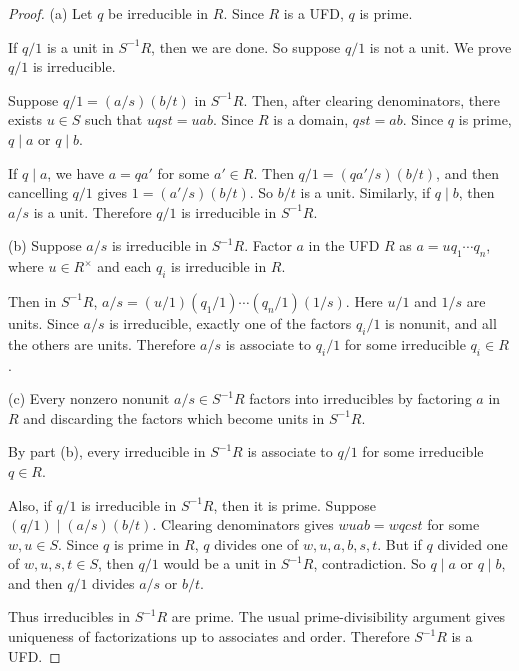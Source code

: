 \documentclass[addpoints,10pt]{exam}
\theoremstyle{plain}
\theoremstyle{definition}
\theoremstyle{plain}
\theoremstyle{definition}
\begin{document}
\begin{proof}
(a)
Let $q$ be irreducible in $R$. Since $R$ is a UFD, $q$ is prime.

If $q/1$ is a unit in $S^{-1}R$, then we are done. So suppose $q/1$ is
not a unit. We prove $q/1$ is irreducible.

Suppose $q/1=(a/s)(b/t)$ in $S^{-1}R$. Then, after clearing
denominators, there exists $u\in S$ such that $uqst=uab$. Since $R$ is
a domain, $qst=ab$. Since $q$ is prime, $q\mid a$ or $q\mid b$.

If $q\mid a$, we have $a=qa'$ for some $a'\in R$. Then
$q/1=(qa'/s)(b/t)$, and then cancelling $q/1$ gives
$1=(a'/s)(b/t)$. So $b/t$ is a unit. Similarly, if $q\mid b$, then
$a/s$ is a unit. Therefore $q/1$ is irreducible in $S^{-1}R$.

(b)
Suppose $a/s$ is irreducible in $S^{-1}R$. Factor $a$ in the UFD $R$ as
$a=u q_1\cdots q_n$, where $u\in R^\times$ and each $q_i$ is irreducible
in $R$.

Then in $S^{-1}R$,
$a/s=(u/1)(q_1/1)\cdots(q_n/1)(1/s)$.
Here $u/1$ and $1/s$ are units. Since $a/s$ is irreducible, exactly one
of the factors $q_i/1$ is nonunit, and all the others are units.
Therefore $a/s$ is associate to $q_i/1$ for some irreducible $q_i\in R$.

(c)
Every nonzero nonunit $a/s\in S^{-1}R$ factors into irreducibles by
factoring $a$ in $R$ and discarding the factors which become units in
$S^{-1}R$.

By part (b), every irreducible in
$S^{-1}R$ is associate to $q/1$ for some irreducible $q\in R$.

Also, if $q/1$ is irreducible in $S^{-1}R$, then it is prime. Suppose $(q/1)\mid (a/s)(b/t)$. Clearing denominators gives
$wuab=wqcst$ for some $w,u\in S$. Since $q$ is prime in $R$, $q$ divides
one of $w,u,a,b,s,t$. But if $q$ divided one of $w,u,s,t\in S$, then
$q/1$ would be a unit in $S^{-1}R$, contradiction. So $q\mid a$ or
$q\mid b$, and then $q/1$ divides $a/s$ or $b/t$.

Thus irreducibles in $S^{-1}R$ are prime. The usual prime-divisibility
argument gives uniqueness of factorizations up to associates and order.
Therefore $S^{-1}R$ is a UFD.

\end{proof}
\end{document}
